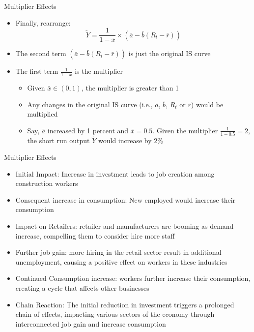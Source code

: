 \documentclass[aspectratio=1610]{beamer}
\begin{document}
\begin{frame}[wide]{Multiplier Effects}
	\begin{itemize}
		\item Finally, rearrange:
		\[\tilde{Y} = \frac{1}{1-\bar{x}} \times \left(\bar{a} - \bar{b}\left(R_t -\bar{r}\right) \right)\]
		\vspace{2mm}
		\item The second term $\left(\bar{a} - \bar{b}\left(R_t -\bar{r}\right) \right)$ is just the original IS curve
		\vspace{2mm}
		\item The first term $\frac{1}{1-\bar{x}} $ is the multiplier
		\vspace{1mm}
		\begin{itemize}
			\item Given $\bar{x} \in (0,1)$, the multiplier is greater than 1
			\vspace{1mm}
			\item Any changes in the original IS curve (i.e., $\bar{a}$, $\bar{b}$, $R_t$ or $\bar{r}$) would be multiplied
			\vspace{1mm}
			\item Say, $\bar{a}$ increased by 1 percent and $\bar{x} = 0.5$. Given the multiplier $\frac{1}{1-0.5} = 2$, the short run output $\tilde{Y}$ would increase by 2\%
		\end{itemize}
	\end{itemize}
\end{frame}

\begin{frame}[wide]{Multiplier Effects}
	\begin{itemize}
		\item Initial Impact:	Increase in investment leads to job creation among construction workers
		\item Consequent increase in consumption:	New employed would increase their consumption
		\item Impact on Retailers:	retailer and manufacturers are booming as demand increase, compelling them to consider hire more staff
		\item Further job gain:	more hiring in the retail sector result in additional unemployment, causing a positive effect on workers in these industries
		\item Continued Consumption increase:	workers further increase their consumption, creating a cycle that affects other businesses
		\item Chain Reaction:	The initial reduction in investment triggers a prolonged chain of effects, impacting various sectors of the economy through interconnected job gain and increase consumption
		
	\end{itemize}	
\end{frame}
\end{document}
